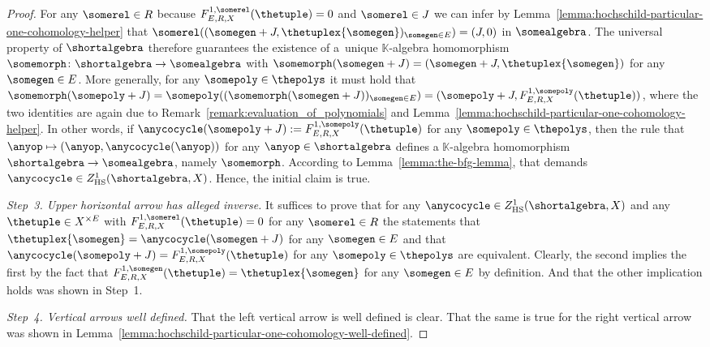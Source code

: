 \documentclass[10pt,a4paper]{amsart}
\numberwithin{equation}{section}
\newcommand{\HScocycles}[3]{Z^{#1}_{\mathrm{HS}}(#2,#3)}
\newcommand{\HSuafuncxx}[6]{F^{#1,#5}_{#2,#3,#4}(#6)}
\newcommand{\fromto}[2]{#1 \to #2}
\newcommand{\xfromto}[3]{#1 \colon  #2 \to #3}
\newcommand{\subproof}[1]{\textit{#1}}
\newcommand{\Sdirectproduct}{\times}
\newcommand{\thegens}{E}
\newcommand{\therels}{R}
\newcommand{\theideal}{J}
\newcommand{\thefield}{\mathbb{K}}
\newcommand{\themodule}{X}
\begin{document}
{{\begin{proof}
For any $\somerel\in\therels$ because $\HSuafuncxx{1}{\thegens}{\therels}{\themodule}{\somerel}{\thetuple}=0$ and $\somerel\in\theideal$ we can infer by Lem\-ma~\ref{lemma:hochschild-particular-one-cohomology-helper} that  $\somerel((\somegen+\theideal,\thetuplex{\somegen})_{\somegen\in\thegens})=(\theideal,0)$ in $\somealgebra$. The universal property of $\shortalgebra$ therefore guarantees the existence of a~unique $\thefield$-algebra homomorphism $\xfromto{\somemorph}{\shortalgebra}{\somealgebra}$ with $\somemorph(\somegen+\theideal)=(\somegen+\theideal,\thetuplex{\somegen})$ for any $\somegen\in\thegens$. More generally, for any $\somepoly\in\thepolys$ it must hold that $\somemorph(\somepoly+\theideal)=\somepoly((\somemorph(\somegen+\theideal))_{\somegen\in\thegens})=(\somepoly+\theideal,\HSuafuncxx{1}{\thegens}{\therels}{\themodule}{\somepoly}{\thetuple})$, where the two identities are again due to Re\-mark~\ref{remark:evaluation_of_polynomials} and Lem\-ma~\ref{lemma:hochschild-particular-one-cohomology-helper}. In other words, if $\anycocycle(\somepoly+\theideal):=\HSuafuncxx{1}{\thegens}{\therels}{\themodule}{\somepoly}{\thetuple}$ for any $\somepoly\in\thepolys$, then the rule that $\anyop\mapsto (\anyop,\anycocycle(\anyop))$ for any $\anyop\in \shortalgebra$ defines a $\thefield$-algebra homomorphism $\fromto{\shortalgebra}{\somealgebra}$, namely $\somemorph$. According to Lem\-ma~\ref{lemma:the-bfg-lemma}, that demands $\anycocycle\in \HScocycles{1}{\shortalgebra}{\themodule}$. Hence, the initial claim is true.

           \subproof{Step~3. Upper horizontal arrow has alleged inverse.} It suffices to prove that for any $\anycocycle\in \HScocycles{1}{\shortalgebra}{\themodule}$ and any $\thetuple\in \themodule^{\Sdirectproduct \thegens}$ with $\HSuafuncxx{1}{\thegens}{\therels}{\themodule}{\somerel}{\thetuple}=0$ for any $\somerel\in\therels$ the statements that $\thetuplex{\somegen}=\anycocycle(\somegen+\theideal)$ for any $\somegen\in\thegens$ and that $\anycocycle(\somepoly+\theideal)=\HSuafuncxx{1}{\thegens}{\therels}{\themodule}{\somepoly}{\thetuple}$ for any $\somepoly\in\thepolys$ are equivalent. Clearly, the second implies the first by the fact that  $\HSuafuncxx{1}{\thegens}{\therels}{\themodule}{\somegen}{\thetuple}=\thetuplex{\somegen}$ for any $\somegen\in\thegens$ by definition. And that the other implication  holds was shown in Step~1.

           \subproof{Step~4. Vertical arrows well defined.} That the left vertical arrow is well defined is clear. That the same is true for the right vertical arrow was shown in Lem\-ma~\ref{lemma:hochschild-particular-one-cohomology-well-defined}.


\end{proof}}}
\end{document}
